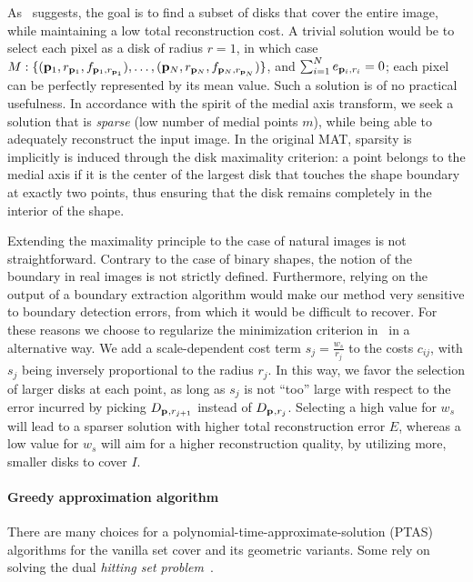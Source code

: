\documentclass[10pt,twocolumn,letterpaper]{article}
\begin{document}
As~ suggests, the goal is to find a subset of disks that cover the entire image, while maintaining
a low total reconstruction cost. 
A trivial solution would be to select each pixel as a disk of radius $r=1$, in which case
$M:\{ (\mathbf{p}_{1},r_{\mathbf{p}_{1}},f_{\mathbf{p}_{1},r_{\mathbf{p}_{1}}}), \ldots, ( \mathbf{p}_{N},r_{\mathbf{p}_{N}},f_{\mathbf{p}_{N},r_{\mathbf{p}_{N}}} ) \}$,
and $\sum_{i=1}^N e_{\mathbf{p}_{i},r_i} = 0$; each pixel can be perfectly represented by its mean value.
Such a solution is of no practical usefulness. 
In accordance with the spirit of the medial axis transform, we seek a solution that is \emph{sparse}
(low number of medial points $m$), while being able to adequately reconstruct the input image.
In the original MAT, sparsity is implicitly is induced through the disk maximality criterion:
a point belongs to the medial axis if it is the center of the largest disk that touches 
the shape boundary at exactly two points, thus ensuring that the disk remains completely in the 
interior of the shape.

Extending the maximality principle to the case of natural images is not straightforward.
Contrary to the case of binary shapes, the notion of the boundary in real images is not strictly defined.
Furthermore, relying on the output of a boundary extraction algorithm would make our method very sensitive
to boundary detection errors, from which it would be difficult to recover.
For these reasons we choose to regularize the minimization criterion in~ in a alternative way. 
We add a scale-dependent cost term $s_j = \frac{w_s}{r_j}$ to the costs $c_{ij}$, with $s_j$ 
being inversely proportional to the radius $r_j$.
In this way, we favor the selection of larger disks at each point, as long as $s_j$ is not ``too'' large
with respect to the error incurred by picking $D_{\mathbf{p}_{},r_{j+1}}$ instead of $D_{\mathbf{p}_{},r_j}$.
Selecting a high value for $w_s$ will lead to a sparser solution with higher total reconstruction error $E$,
whereas a low value for $w_s$ will aim for a higher reconstruction quality, by utilizing more, smaller disks
to cover $I$.

\paragraph{Greedy approximation algorithm}
There are many choices for a polynomial-time-approximate-solution (PTAS) algorithms for the vanilla set cover
and its geometric variants.
Some rely on solving the dual \emph{hitting set problem}~\cite{bronnimann1995almost}.
\end{document}
